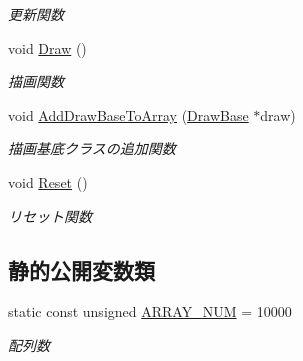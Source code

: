 \begin{DoxyCompactItemize}
\begin{DoxyCompactList}\small\item\em 更新関数 \end{DoxyCompactList}\item 
void \mbox{\hyperlink{class_render_target_main_a36625d89ab2c8ae2677648589d8cb576}{Draw}} ()
\begin{DoxyCompactList}\small\item\em 描画関数 \end{DoxyCompactList}\item 
void \mbox{\hyperlink{class_render_target_main_a4c43fec8dece5c7cb49d4fb2a53c1796}{Add\+Draw\+Base\+To\+Array}} (\mbox{\hyperlink{class_draw_base}{Draw\+Base}} $\ast$draw)
\begin{DoxyCompactList}\small\item\em 描画基底クラスの追加関数 \end{DoxyCompactList}\item 
void \mbox{\hyperlink{class_render_target_main_af1f2134824523e02235f849b443b4ed7}{Reset}} ()
\begin{DoxyCompactList}\small\item\em リセット関数 \end{DoxyCompactList}\end{DoxyCompactItemize}
\subsection*{静的公開変数類}
\begin{DoxyCompactItemize}
\item 
static const unsigned \mbox{\hyperlink{class_render_target_main_ad677e34abb5ef7673d8ab52f47d8729e}{A\+R\+R\+A\+Y\+\_\+\+N\+UM}} = 10000
\begin{DoxyCompactList}\small\item\em 配列数 \end{DoxyCompactList}\end{DoxyCompactItemize}
